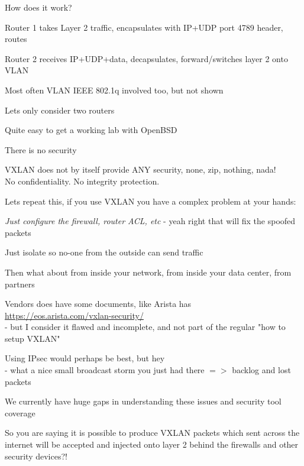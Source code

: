 \documentclass[18pt,landscape,a4paper,footrule]{foils}
\begin{document}

How does it work?

\begin{list2}
\item Router 1 takes Layer 2 traffic, encapsulates with IP+UDP port 4789 header, routes
\item Router 2 receives IP+UDP+data, decapsulates, forward/switches layer 2 onto VLAN
\item Most often VLAN IEEE 802.1q involved too, but not shown
\item Lets only consider two routers
\end{list2}

\vskip 5mm
\centerline{Quite easy to get a working lab with OpenBSD \smiley}


There is no security

VXLAN does not by itself provide ANY security, none, zip, nothing, nada! \\
No confidentiality. No integrity protection.

Lets repeat this, if you use VXLAN you have a complex problem at your hands:

\begin{list2}
\item \emph{Just configure the firewall, router ACL, etc} - yeah right that will fix the spoofed packets
\item Just isolate so no-one from the outside can send traffic
\item Then what about from inside your network, from inside your data center, from partners
\item Vendors does have some documents, like Arista has\\ \url{https://eos.arista.com/vxlan-security/}\\ - but I consider it flawed and incomplete, and not part of the regular "how to setup VXLAN"
\item Using IPsec would perhaps be best, but hey \\
- what a nice small broadcast storm you just had there $=>$ backlog and lost packets
\end{list2}

\vskip 1cm
\centerline{We currently have huge gaps in understanding these issues and security tool coverage}

So you are saying it is possible to produce VXLAN packets which sent across the internet will be accepted and injected onto layer 2 behind the firewalls and other security devices?!
\end{document}
